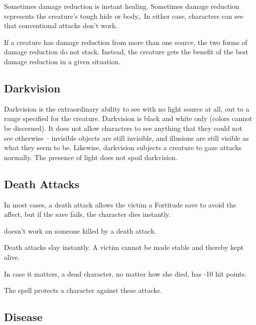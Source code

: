 Sometimes damage reduction is instant healing. Sometimes damage reduction represents 
the creature's tough hide or body,. In either case, characters can see that conventional 
attacks don't work.

If a creature has damage reduction from more than one source, the two forms of 
damage reduction do not stack. Instead, the creature gets the benefit of the best 
damage reduction in a given situation. 

\subsection{Darkvision}

Darkvision is the extraordinary ability to see with no light source at all, out 
to a range specified for the creature. Darkvision is black and white only (colors 
cannot be discerned). It does not allow characters to see anything that they could 
not see otherwise -- invisible objects are still invisible, and illusions are still 
visible as what they seem to be. Likewise, darkvision subjects a creature to gaze 
attacks normally. The presence of light does not spoil darkvision.

\subsection{Death Attacks}

In most cases, a death attack allows the victim a Fortitude save to avoid the affect, 
but if the save fails, the character dies instantly.

\begin{itemize*}
\item {} doesn't work on someone killed by a death attack. 
\item Death attacks slay instantly. A victim cannot be made stable and thereby kept alive.
\item In case it matters, a dead character, no matter how she died, has -10 hit points.
\item The spell  protects a character against these attacks.
\end{itemize*}

\subsection{Disease}

